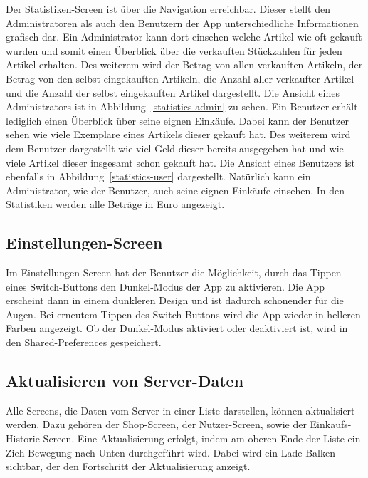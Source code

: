 Der Statistiken-Screen ist über die Navigation erreichbar.
Dieser stellt den Administratoren als auch den Benutzern der App unterschiedliche Informationen grafisch dar.
Ein Administrator kann dort einsehen welche Artikel wie oft gekauft wurden und somit einen Überblick über die verkauften Stückzahlen für jeden Artikel erhalten.
Des weiterem wird der Betrag von allen verkauften Artikeln, der Betrag von den selbst eingekauften Artikeln, die Anzahl aller verkaufter Artikel und die Anzahl der selbst eingekauften Artikel dargestellt.
Die Ansicht eines Administrators ist in Abbildung~\ref{statistics-admin} zu sehen.
Ein Benutzer erhält lediglich einen Überblick über seine eignen Einkäufe.
Dabei kann der Benutzer sehen wie viele Exemplare eines Artikels dieser gekauft hat.
Des weiterem wird dem Benutzer dargestellt wie viel Geld dieser bereits ausgegeben hat und wie viele Artikel dieser insgesamt schon gekauft hat.
Die Ansicht eines Benutzers ist ebenfalls in Abbildung~\ref{statistics-user} dargestellt.
Natürlich kann ein Administrator, wie der Benutzer, auch seine eignen Einkäufe einsehen.
In den Statistiken werden alle Beträge in Euro angezeigt.


\subsection{Einstellungen-Screen} \label{subsec:settings-screen}

Im Einstellungen-Screen hat der Benutzer die Möglichkeit, durch das Tippen eines Switch-Buttons den Dunkel-Modus der App zu aktivieren.
Die App erscheint dann in einem dunkleren Design und ist dadurch schonender für die Augen.
Bei erneutem Tippen des Switch-Buttons wird die App wieder in helleren Farben angezeigt.
Ob der Dunkel-Modus aktiviert oder deaktiviert ist, wird in den Shared-Preferences gespeichert.

\subsection{Aktualisieren von Server-Daten}\label{subsec:aktualisieren-von-server-daten}

Alle Screens, die Daten vom Server in einer Liste darstellen, können aktualisiert werden.
Dazu gehören der Shop-Screen, der Nutzer-Screen, sowie der Einkaufs-Historie-Screen.
Eine Aktualisierung erfolgt, indem am oberen Ende der Liste ein Zieh-Bewegung nach Unten durchgeführt wird.
Dabei wird ein Lade-Balken sichtbar, der den Fortschritt der Aktualisierung anzeigt.

